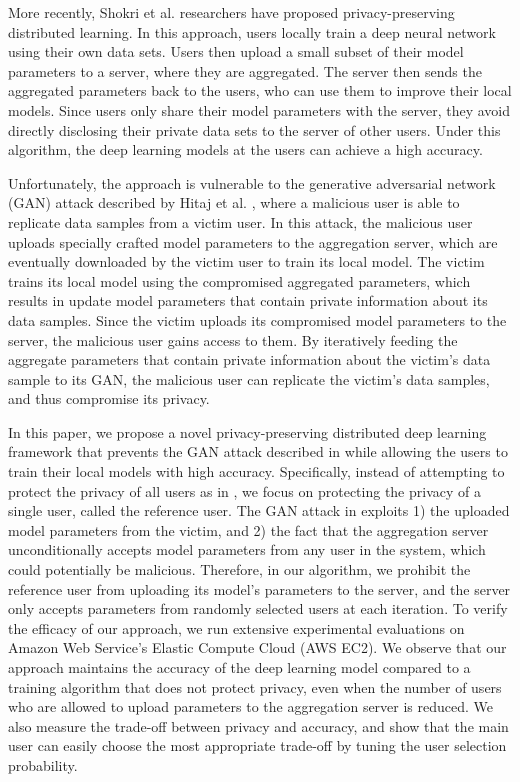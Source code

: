 \documentclass[conference]{IEEEtran}
\begin{document}
More recently,  Shokri et al.  \cite{shokri2015privacy} researchers have proposed privacy-preserving distributed learning. In this
approach, users locally train a deep neural network using their own data sets. Users then upload a small subset of their model
parameters to a server, where they  are aggregated. The server then sends the aggregated parameters back to the users, who can use
them to improve their local models. Since users only share their model parameters with the server, they avoid directly disclosing their
private data sets to the server of other users. Under this algorithm, the deep learning models at the users can achieve a high
accuracy. 

Unfortunately,  the approach \cite{shokri2015privacy} is vulnerable to the generative adversarial network (GAN) attack described by 
Hitaj  et al. \cite{hitaj2017deep}, where  a malicious user is able to replicate data samples from a victim user. In this attack, 
the malicious user uploads specially crafted model parameters to the aggregation server, which are eventually downloaded by the victim
user to train its local model. The victim trains its local model using the compromised aggregated parameters, which results in
update model parameters that contain private information about its data samples. Since the victim uploads its compromised model
parameters to the server, the malicious user gains access to them. By iteratively feeding the aggregate parameters that contain private
information about the victim's data sample to its GAN, the malicious user can replicate the victim's data samples, and thus compromise its
privacy.

In this paper, we propose a novel privacy-preserving distributed deep learning framework that prevents the GAN attack described in 
\cite{hitaj2017deep} while allowing the users to train their local models with high accuracy. 
Specifically, instead of attempting to protect the privacy of all users as in \cite{shokri2015privacy}, we focus on protecting the
privacy of a single user, called the reference user. The GAN attack in \cite{hitaj2017deep} exploits 1) the uploaded
model parameters from the victim, and 2) the fact that the  aggregation server unconditionally accepts model parameters from any user
in the system, which could potentially be malicious. Therefore, in our algorithm, we prohibit the reference user from uploading its
model's parameters to the server, and the server only accepts parameters from randomly selected users at each iteration. 
To verify the efficacy of our approach, we run extensive experimental evaluations on Amazon Web Service's Elastic
Compute Cloud (AWS EC2). We observe that our approach maintains the accuracy of the deep learning model compared to a training
algorithm that does not protect privacy, even when the number of users who are allowed to upload parameters to the aggregation
server is reduced. We also measure the trade-off between privacy and accuracy, and show that the main user can easily choose the most
appropriate trade-off by tuning the user selection probability. 
\end{document}
